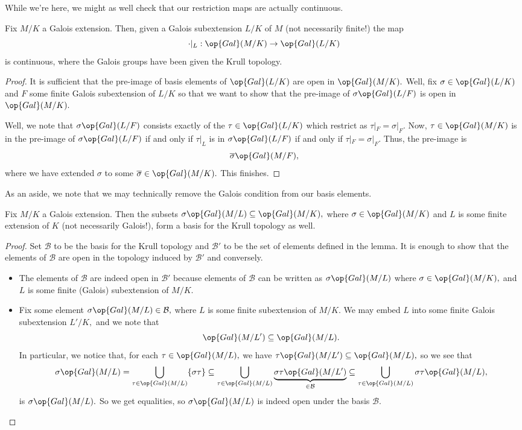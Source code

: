 While we're here, we might as well check that our restriction maps are actually continuous.
\begin{prop}
	Fix $M/K$ a Galois extension. Then, given a Galois {sub}extension $L/K$ of $M$ (not necessarily finite!) the map
	\[\cdot|_L:\op{Gal}(M/K)\to\op{Gal}(L/K)\]
	is continuous, where the Galois groups have been given the Krull topology.
\end{prop}
\begin{proof}
	It is sufficient that the pre-image of basis elements of $\op{Gal}(L/K)$ are open in $\op{Gal}(M/K).$ Well, fix $\sigma\in\op{Gal}(L/K)$ and $F$ some finite Galois subextension of $L/K$ so that we want to show that the pre-image of $\sigma\op{Gal}(L/F)$ is open in $\op{Gal}(M/K).$

	Well, we note that $\sigma\op{Gal}(L/F)$ consists exactly of the $\tau\in\op{Gal}(L/K)$ which restrict as $\tau|_F=\sigma|_F.$ Now, $\tau\in\op{Gal}(M/K)$ is in the pre-image of $\sigma\op{Gal}(L/F)$ if and only if $\tau|_L$ is in $\sigma\op{Gal}(L/F)$ if and only if $\tau|_F=\sigma|_F.$ Thus, the pre-image is
	\[\overline\sigma\op{Gal}(M/F),\]
	where we have extended $\sigma$ to some $\overline\sigma\in\op{Gal}(M/K).$ This finishes.
\end{proof}
As an aside, we note that we may technically remove the Galois condition from our basis elements.
\begin{lemma}
	Fix $M/K$ a Galois extension. Then the subsets $\sigma\op{Gal}(M/L)\subseteq\op{Gal}(M/K),$ where $\sigma\in\op{Gal}(M/K)$ and $L$ is some finite extension of $K$ (not necessarily Galois!), form a basis for the Krull topology as well.
\end{lemma}
\begin{proof}
	Set $\mathcal B$ to be the basis for the Krull topology and $\mathcal B'$ to be the set of elements defined in the lemma. It is enough to show that the elements of $\mathcal B$ are open in the topology induced by $\mathcal B'$ and conversely.
	\begin{itemize}
		\item The elements of $\mathcal B$ are indeed open in $\mathcal B'$ because elements of $\mathcal B$ can be written as $\sigma\op{Gal}(M/L)$ where $\sigma\in\op{Gal}(M/K),$ and $L$ is some finite (Galois) sub{extension} of $M/K.$
		\item Fix some element $\sigma\op{Gal}(M/L)\in\mathcal B,$ where $L$ is some finite sub{extension} of $M/K.$ We may embed $L$ into some finite Galois sub{extension} $L'/K,$ and we note that
		\[\op{Gal}(M/L')\subseteq\op{Gal}(M/L).\]
		In particular, we notice that, for each $\tau\in\op{Gal}(M/L),$ we have $\tau\op{Gal}(M/L')\subseteq\op{Gal}(M/L),$ so we see that
		\[\sigma\op{Gal}(M/L)=\bigcup_{\tau\in\op{Gal}(M/L)}\{\sigma\tau\}\subseteq\bigcup_{\tau\in\op{Gal}(M/L)}\underbrace{\sigma\tau\op{Gal}(M/L')}_{\in\mathcal B}\subseteq\bigcup_{\tau\in\op{Gal}(M/L)}\sigma\tau\op{Gal}(M/L),\]
		is $\sigma\op{Gal}(M/L).$ So we get equalities, so $\sigma\op{Gal}(M/L)$ is indeed open under the basis $\mathcal B.$
		\qedhere
	\end{itemize}
\end{proof}
